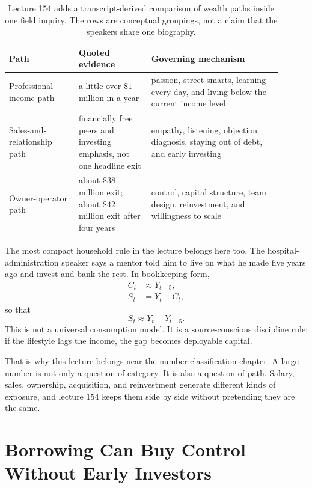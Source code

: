 \documentclass[11pt,oneside]{book}
\begin{document}
\begin{table}
\centering
\small
\begin{tabular}{p{0.23\linewidth}p{0.24\linewidth}p{0.43\linewidth}}
\hline
Path & Quoted evidence & Governing mechanism \\
\hline
Professional-income path & a little over \(\$1\) million in a year & passion, street smarts, learning every day, and living below the current income level \\
Sales-and-relationship path & financially free peers and investing emphasis, not one headline exit & empathy, listening, objection diagnosis, staying out of debt, and early investing \\
Owner-operator path & about \(\$38\) million exit; about \(\$42\) million exit after four years & control, capital structure, team design, reinvestment, and willingness to scale \\
\hline
\end{tabular}
\caption{Lecture 154 adds a transcript-derived comparison of wealth paths inside one field inquiry. The rows are conceptual groupings, not a claim that the speakers share one biography.}
\end{table}

The most compact household rule in the lecture belongs here too. The hospital-administration speaker says a mentor told him to live on what he made five years ago and invest and bank the rest. In bookkeeping form,
\begin{align}
C_t &\approx Y_{t-5},\\
S_t &= Y_t-C_t,
\end{align}
so that
\begin{equation}
S_t \approx Y_t-Y_{t-5}.
\end{equation}
This is not a universal consumption model. It is a source-conscious discipline rule: if the lifestyle lags the income, the gap becomes deployable capital.

That is why this lecture belongs near the number-classification chapter. A large number is not only a question of category. It is also a question of path. Salary, sales, ownership, acquisition, and reinvestment generate different kinds of exposure, and lecture 154 keeps them side by side without pretending they are the same.

\section{Borrowing Can Buy Control Without Early Investors}
\end{document}
